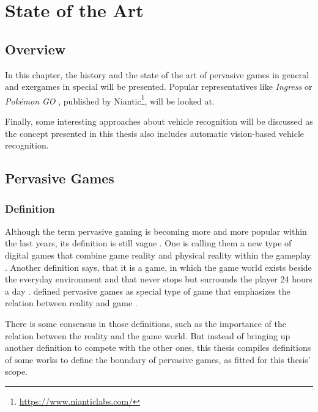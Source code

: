 \chapter{State of the Art}\label{ch:stateOfTheArt}
\section{Overview}
In this chapter, the history and the state of the art of pervasive games in general and exergames in special will be presented. Popular representatives like \emph{Ingress} \citep{Ingress} or \emph{Pok\'{e}mon GO} \citep{PokemonGO}, published by Niantic\footnote{\url{https://www.nianticlabs.com/}}, will be looked at.

Finally, some interesting approaches about vehicle recognition
will be discussed as the concept presented in this thesis also includes automatic vision-based vehicle recognition.

\section{Pervasive Games}
\subsection{Definition}
Although the term pervasive gaming is becoming more and more popular within the last years, its definition is still vague \citep{nieuwdorp2009pervasive}. One is calling them a new type of digital games that combine game reality and physical reality within the gameplay \citep{Lankoski:2004:CSP:1028014.1028083}. Another definition says, that it is a game, in which the game world exists beside the everyday environment and that never stops but surrounds the player 24 hours a day \citep{sotamaa2002all}.
\citeauthor{nieuwdorp2009pervasive} defined pervasive games as special type of game that emphasizes the relation between reality and game \citep{nieuwdorp2009pervasive}.

There is some consensus in those definitions, such as the importance of the relation between the reality and the game world. But instead of bringing up another definition to compete with the other ones, this thesis compiles definitions of some works to define the boundary of pervasive games, as fitted for this thesis' scope.

